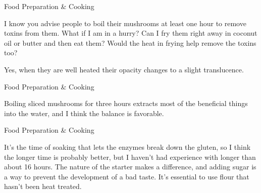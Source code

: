 \documentclass[11pt,oneside,openany,extrafontsizes]{memoir}
\begin{document}
\begin{qaexchange}{Food Preparation \& Cooking}

    \begin{question}
        I know you advise people to boil their mushrooms at least one hour to remove toxins from them. What if I am in a hurry? Can I fry them right away in coconut oil or butter and then eat them? Would the heat in frying help remove the toxins too?
    \end{question}

    \begin{answer}
      Yes, when they are well heated their opacity changes to a slight translucence.
    \end{answer}
\end{qaexchange}

\begin{standalonequote}{Food Preparation \& Cooking}

    \begin{answer}
       Boiling sliced mushrooms for three hours extracts most of the beneficial things into the water, and I think the balance is favorable.
    \end{answer}
\end{standalonequote}

\begin{standalonequote}{Food Preparation \& Cooking}

    \begin{answer}
       It's the time of soaking that lets the enzymes break down the gluten, so I think the longer time is probably better, but I haven't had experience with longer than about 16 hours. The nature of the starter makes a difference, and adding sugar is a way to prevent the development of a bad taste. It's essential to use flour that hasn't been heat treated. 
    \end{answer}
\end{standalonequote}
\end{document}
